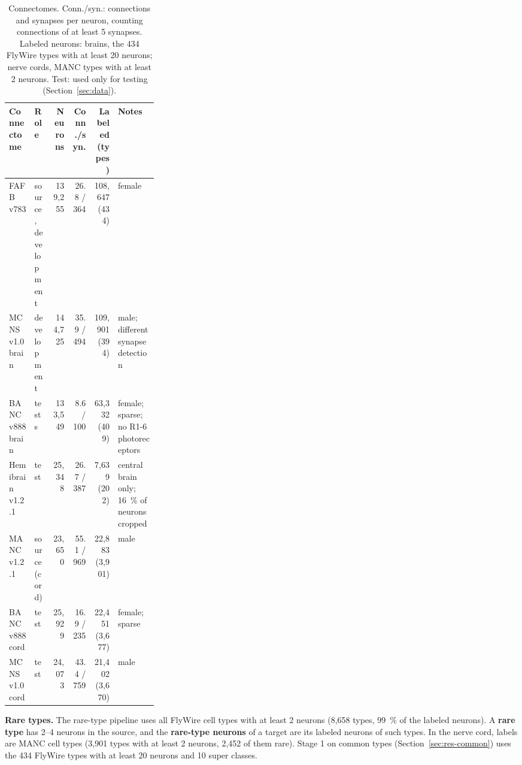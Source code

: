 \documentclass[11pt,a4paper]{article}
\begin{document}
\begin{table}[tbp]
\centering
\footnotesize
\caption{Connectomes. Conn./syn.: connections and synapses per neuron, counting connections of at least 5 synapses. Labeled neurons: brains, the 434 FlyWire types with at least 20 neurons; nerve cords, MANC types with at least 2 neurons. Test: used only for testing (Section~\ref{sec:data}).}\label{tab:1}
\setlength{\tabcolsep}{4pt}
\begin{tabularx}{\linewidth}{>{\raggedright\arraybackslash}p{0.17\linewidth}>{\raggedright\arraybackslash}p{0.12\linewidth}rrrL}
\toprule
Connectome & Role & Neurons & Conn./syn. & Labeled (types) & Notes \\
\midrule
FAFB v783 & source, develop\-ment & 139,255 & 26.8 / 364 & 108,647 (434) & female \\
MCNS v1.0 brain & develop\-ment & 144,725 & 35.9 / 494 & 109,901 (394) & male; different synapse detection \\
BANC v888 brain & tests & 133,549 & 8.6 / 100 & 63,332 (409) & female; sparse; no R1-6 photoreceptors \\
Hemibrain v1.2.1 & test & 25,348 & 26.7 / 387 & 7,639 (202) & central brain only; 16~\% of neurons cropped \\
MANC v1.2.1 & source (cord) & 23,650 & 55.1 / 969 & 22,883 (3,901) & male \\
BANC v888 cord & test & 25,929 & 16.9 / 235 & 22,451 (3,677) & female; sparse \\
MCNS v1.0 cord & test & 24,073 & 43.4 / 759 & 21,402 (3,670) & male \\
\bottomrule
\end{tabularx}
\end{table}

\textbf{Rare types.} The rare-type pipeline uses all FlyWire cell types with at least 2 neurons (8,658 types, 99~\% of the labeled neurons). A \textbf{rare type} has 2–4 neurons in the source, and the \textbf{rare-type neurons} of a target are its labeled neurons of such types. In the nerve cord, labels are MANC cell types (3,901 types with at least 2 neurons, 2,452 of them rare). Stage 1 on common types (Section~\ref{sec:res-common}) uses the 434 FlyWire types with at least 20 neurons and 10 super classes.
\end{document}

